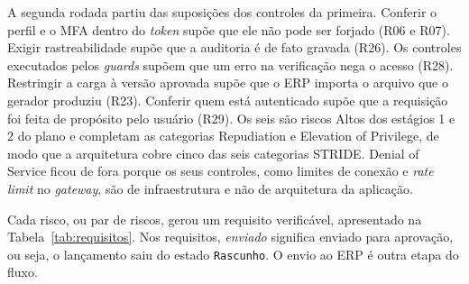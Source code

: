 \documentclass[conference]{IEEEtran}
\begin{document}
A segunda rodada partiu das suposições dos controles da primeira. Conferir o perfil e o MFA dentro do \textit{token} supõe que ele não pode ser forjado (R06 e R07). Exigir rastreabilidade supõe que a auditoria é de fato gravada (R26). Os controles executados pelos \textit{guards} supõem que um erro na verificação nega o acesso (R28). Restringir a carga à versão aprovada supõe que o ERP importa o arquivo que o gerador produziu (R23). Conferir quem está autenticado supõe que a requisição foi feita de propósito pelo usuário (R29). Os seis são riscos Altos dos estágios 1 e 2 do plano e completam as categorias Repudiation e Elevation of Privilege, de modo que a arquitetura cobre cinco das seis categorias STRIDE. Denial of Service ficou de fora porque os seus controles, como limites de conexão e \textit{rate limit} no \textit{gateway}, são de infraestrutura e não de arquitetura da aplicação.

Cada risco, ou par de riscos, gerou um requisito verificável, apresentado na Tabela~\ref{tab:requisitos}. Nos requisitos, \textit{enviado} significa enviado para aprovação, ou seja, o lançamento saiu do estado \texttt{Rascunho}. O envio ao ERP é outra etapa do fluxo.
\end{document}
